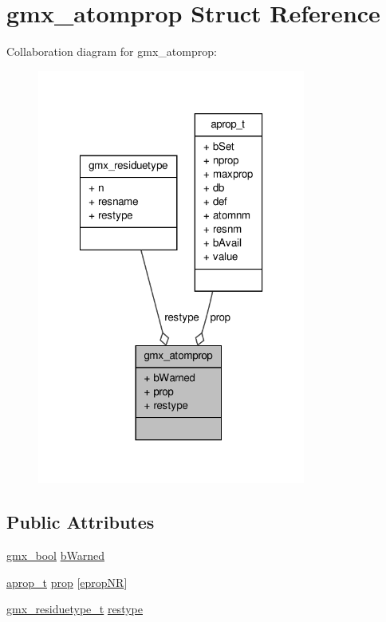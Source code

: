 \hypertarget{structgmx__atomprop}{\section{gmx\-\_\-atomprop \-Struct \-Reference}
\label{structgmx__atomprop}
}


\-Collaboration diagram for gmx\-\_\-atomprop\-:
\nopagebreak
\begin{figure}[H]
\begin{center}
\leavevmode
\includegraphics[width=250pt]{structgmx__atomprop__coll__graph}
\end{center}
\end{figure}
\subsection*{\-Public \-Attributes}
\begin{DoxyCompactItemize}
\item 
\hyperlink{include_2types_2simple_8h_a8fddad319f226e856400d190198d5151}{gmx\-\_\-bool} \hyperlink{structgmx__atomprop_aa8d80fb753991743f9a5db355ace7cc4}{b\-Warned}
\item 
\hyperlink{structaprop__t}{aprop\-\_\-t} \hyperlink{structgmx__atomprop_acd01624cf85566e9d176ed11a6b929be}{prop} \mbox{[}\hyperlink{share_2template_2gromacs_2atomprop_8h_acedc21792913cbec6ca54f6981c5eddda14d4fcc6bae15773632b7f0b7b8a5dd8}{eprop\-N\-R}\mbox{]}
\item 
\hyperlink{include_2index_8h_af0ab0a62e166db9905eac3aa7e1203f3}{gmx\-\_\-residuetype\-\_\-t} \hyperlink{structgmx__atomprop_aeee43f153c1eb94165656f476bfb243d}{restype}
\end{DoxyCompactItemize}



